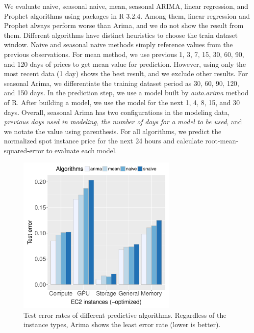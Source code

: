 \documentclass[graybox]{svmult}
\begin{document}
We evaluate naive, seasonal naive, mean, seasonal ARIMA, linear regression, and Prophet algorithms using packages in R 3.2.4. Among them, linear regression and Prophet always perform worse than Arima, and we do not show the result from them. Different algorithms have distinct heuristics to choose the train dataset window. Naive and seasonal naive methods simply reference values from the previous observations. For mean method, we use previous 1, 3, 7, 15, 30, 60, 90, and 120 days of prices to get mean value for prediction. However, using only the most recent data (1 day) shows the best result, and we exclude other results. For seasonal Arima, we differentiate the training dataset period as 30, 60, 90, 120, and 150 days. In the prediction step, we use a model built by \textit{auto.arima} method of R. After building a model, we use the model for the next 1, 4, 8, 15, and 30 days. Overall, seasonal Arima has two configurations in the modeling data, \emph{previous days used in modeling, the number of days for a model to be used}, and we notate the value using parenthesis. For all algorithms, we predict the normalized spot instance price for the next 24 hours and calculate root-mean-squared-error to evaluate each model.

\begin{figure}
  \centering\includegraphics[width=0.7\textwidth]{figures/algorithm-compare-different-instance-type.pdf}\caption{Test error rates of different predictive algorithms. Regardless of the instance types, Arima shows the least error rate (lower is better).\label{fig:algo-diff-inst}}
\end{figure}
\end{document}
